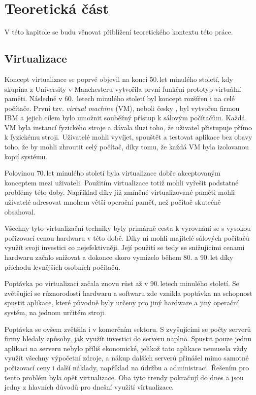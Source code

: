 \chapter{Teoretická část}\label{chap:teorie}

V této kapitole se budu věnovat přiblížení teoretického kontextu této práce.

\section{Virtualizace}

Koncept virtualizace se poprvé objevil na konci 50.\,let minulého století, kdy skupina z University v Manchesteru vytvořila první funkční prototyp virtuální paměti. Následně v 60.\, letech minulého století byl koncept rozšířen i na celé počítače. První tzv. \textit{virtual machine} (VM), neboli česky , byl vytvořen firmou IBM a jejich cílem bylo umožnit souběžný přístup k sálovým počítačům. Každá VM byla instancí fyzického stroje a dávala iluzi toho, že uživatel přistupuje přímo k fyzickému stroji. Uživatelé mohli vyvíjet, spouštět a testovat aplikace bez obavy toho, že by mohli zhroutit celý počítač, díky tomu, že každá VM byla izolovanou kopií systému. 

Polovinou 70.\,let minulého století byla virtualizace dobře akceptovaným konceptem mezi uživateli. Použitím virtualizace totiž mohli vyřešit podstatné problémy této doby. Například díky již zmíněné virtualizované paměti mohli uživatelé adresovat mnohem větší operační paměť, než počítač skutečně obsahoval. 

Všechny tyto virtualizační techniky byly primárně cesta k vyrovnání se s vysokou pořizovací cenou hardwaru v této době. Díky ní mohli majitelé sálových počítačů využít svoji investici co nejefektivněji. Její použití se tedy se snižujícími cenami hardwaru začalo snižovat a dokonce skoro vymizelo během 80. a 90.\,let díky příchodu levnějších osobních počítačů.  

Poptávka po virtualizaci začala znovu růst až v 90.\,letech minulého století. Se zvětšující se různorodostí hardwaru a softwaru zde vznikla poptávka na schopnost spustit aplikace, které původně byly určeny pro jiný hardware a jiný operační systém, na jednom určitém stroji. 

Poptávka se ovšem zvětšila i v komerčním sektoru. S zvyšujícími se počty serverů firmy hledaly způsoby, jak využít investici do serveru naplno. Spustit pouze jednu aplikaci na serveru nebylo příliš ekonomické, jelikož tato aplikace nemusela vždy využít všechny výpočetní zdroje, a nákup dalších serverů přinášel mimo samotné pořizovací ceny i další náklady, například na údržbu a administraci. Řešením pro tento problém byla opět virtualizace. Oba tyto trendy pokračují do dnes a jsou jedny z hlavních důvodů pro dnešní využití virtualizace. 

